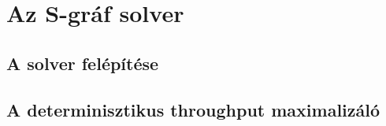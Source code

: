 \chapter{Az S-gráf solver} \label{s-graph_framework}
\section{A solver felépítése}
\section{A determinisztikus throughput maximalizáló} \label{throughput_solver}